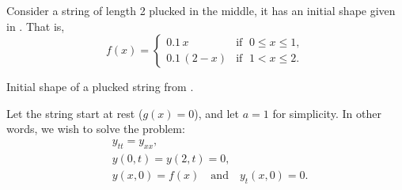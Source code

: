 \documentclass{ximera}
\begin{document}
    \begin{example} \label{example:pluckedstring}
    Consider a string of length 2 plucked in the middle, it has an initial shape given in . That is,
    \begin{equation*}
        f(x) = 
        \begin{cases}
            0.1\, x & \text{if } \; 0 \leq x \leq 1 , \\
            0.1\, (2-x) & \text{if } \; 1 < x \leq 2 .
        \end{cases}
    \end{equation*}
    
    \begin{myfig}
        \capstart
        
        \caption{Initial shape of a plucked string from .\label{wave:pluckedstrfig}}
    \end{myfig}
    
    Let the string start at rest ($g(x) = 0$), and let $a=1$ for simplicity.  In other words, we wish to solve the problem:
    \begin{align*}
        & y_{tt} = y_{xx}, \\
        & y(0,t) = y(2,t)= 0 , \\
        & y(x,0) = f(x) \quad \text{and} \quad y_t(x,0)= 0 .
    \end{align*}
    

\end{example}
\end{document}
